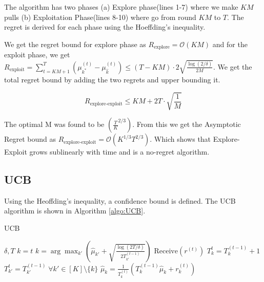 \documentclass[11pt]{article}
\begin{document}
The algorithm has two phases (a) Explore phase(lines 1-7) where we make $KM$ pulls  (b) Exploitation Phase(lines 8-10) where go from round $KM$ to $T$. The regret is derived for each phase using the Hoeffding's inequality. 

\normalfont

We get the regret bound for explore phase as $R_{\text{explore}} = \mathcal{O}(KM)$ and for the exploit phase, we get $R_{\text{exploit}} = \sum_{t=KM+1}^T (\mu_{k^*}^{(t)} - \mu_{\hat{k}}^{(t)}) \leq (T - KM) \cdot 2 \sqrt{\frac{\log (2/\delta)}{2M}}$. We get the total regret bound by adding the two regrets and upper bounding it.

\begin{equation}
R_{\text{explore-exploit}} \leq KM + 2T \cdot \sqrt{\frac{1}{M}}
\end{equation}


The optimal M was found to be $(\frac{T}{K}^{2/3})$. From this we get the Asymptotic Regret bound as $R_{\text{explore-exploit}}  =  \mathcal{O}(K^{1/3}T^{2/3})$. Which shows that Explore-Exploit grows sublinearly with time and is a no-regret algorithm.

\subsection{UCB}
\label{sec:ucb}
Using the Heoffding's inequality, a confidence bound is defined.
\normalfont
The UCB algorithm is shown in Algorithm \ref{algo:UCB}.

\begin{algorithm}[H]
\caption{UCB}
\label{algo:UCB}
\begin{algorithmic}[1]
\REQUIRE $\delta, T$
\STATE $k = t$
\ELSE
\STATE $k = \arg\max_{k'} \left( \widehat{\mu}_{k'} + \sqrt{\frac{\log(2T/\delta)}{2T^{(t-1)}_{k'}}} \right)$
\ENDIF
\STATE $\text{Receive}(r^{(t)})$
\STATE $T^{t}_k = T^{(t-1)}_k + 1$
\STATE $T^{t}_{k'} = T^{(t-1)}_{k'}\; \forall k' \in [K]\setminus \{k\}$
\STATE $\widehat{\mu}_k = \frac{1}{T_{k}^{(t)}}\left( T^{(t-1)}_k \widehat{\mu}_k + r^{(t)}_k \right)$
\ENDFOR
\end{algorithmic}
\end{algorithm}
\end{document}
